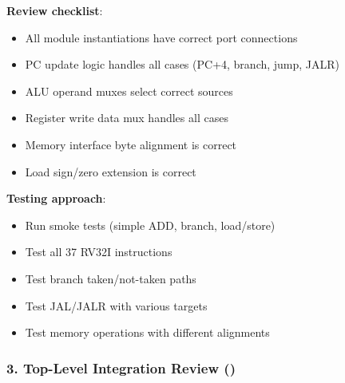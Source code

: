 \begin{record}

\textbf{Review checklist}:

\begin{itemize}
\tightlist
\item[$\square$]
  All module instantiations have correct port connections
\item[$\square$]
  PC update logic handles all cases (PC+4, branch, jump, JALR)
\item[$\square$]
  ALU operand muxes select correct sources
\item[$\square$]
  Register write data mux handles all cases
\item[$\square$]
  Memory interface byte alignment is correct
\item[$\square$]
  Load sign/zero extension is correct
\end{itemize}

\textbf{Testing approach}:

\begin{itemize}
\tightlist
\item
  Run smoke tests (simple ADD, branch, load/\allowbreak{}store)
\item
  Test all 37 RV32I instructions
\item
  Test branch taken/\allowbreak{}not-taken paths
\item
  Test JAL/JALR with various targets
\item
  Test memory operations with different alignments
\end{itemize}

\end{record}

\subsubsection{\texorpdfstring{3. Top-Level Integration Review
()}{3. Top-Level Integration Review ()}}\label{cr:fix:cpu-integration-summary:3-top-level-integration-review-rv32i-cpu-topsv}

